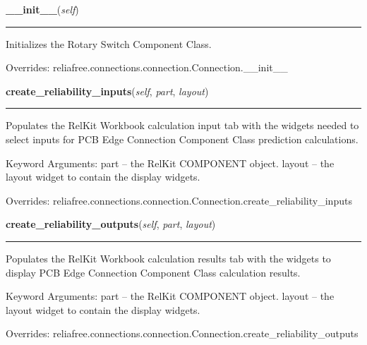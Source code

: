 \hspace{.8\funcindent}\begin{boxedminipage}{\funcwidth}

    \raggedright \textbf{\_\_init\_\_}(\textit{self})

    \vspace{-1.5ex}

    \rule{\textwidth}{0.5\fboxrule}
\setlength{\parskip}{2ex}
    Initializes the Rotary Switch Component Class.

\setlength{\parskip}{1ex}
      Overrides: reliafree.connections.connection.Connection.\_\_init\_\_

    \end{boxedminipage}

    \vspace{0.5ex}

\hspace{.8\funcindent}\begin{boxedminipage}{\funcwidth}

    \raggedright \textbf{create\_reliability\_inputs}(\textit{self}, \textit{part}, \textit{layout})

    \vspace{-1.5ex}

    \rule{\textwidth}{0.5\fboxrule}
\setlength{\parskip}{2ex}
    Populates the RelKit Workbook calculation input tab with the widgets
    needed to select inputs for PCB Edge Connection Component Class 
    prediction calculations.

    Keyword Arguments: part   -- the RelKit COMPONENT object. layout -- 
    the layout widget to contain the display widgets.

\setlength{\parskip}{1ex}
      Overrides: reliafree.connections.connection.Connection.create\_reliability\_inputs

    \end{boxedminipage}

    \vspace{0.5ex}

\hspace{.8\funcindent}\begin{boxedminipage}{\funcwidth}

    \raggedright \textbf{create\_reliability\_outputs}(\textit{self}, \textit{part}, \textit{layout})

    \vspace{-1.5ex}

    \rule{\textwidth}{0.5\fboxrule}
\setlength{\parskip}{2ex}
    Populates the RelKit Workbook calculation results tab with the 
    widgets to display PCB Edge Connection Component Class calculation 
    results.

    Keyword Arguments: part   -- the RelKit COMPONENT object. layout -- 
    the layout widget to contain the display widgets.

\setlength{\parskip}{1ex}
      Overrides: reliafree.connections.connection.Connection.create\_reliability\_outputs

    \end{boxedminipage}

